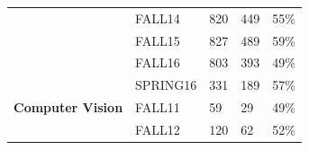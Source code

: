 \begin{table}[]
\begin{tabular}{lllll}
\textbf{}                                                                            & FALL14                                & 820                                                                                       & 449                                                                                        & 55\%                                                                                                  \\
\textbf{}                                                                            & FALL15                                & 827                                                                                       & 489                                                                                        & 59\%                                                                                                  \\
\textbf{}                                                                            & FALL16                                & 803                                                                                       & 393                                                                                        & 49\%                                                                                                  \\
\textbf{}                                                                            & SPRING16                              & 331                                                                                       & 189                                                                                        & 57\%                                                                                                  \\
\textbf{Computer Vision}                                                             & FALL11                                & 59                                                                                        & 29                                                                                         & 49\%                                                                                                  \\
\textbf{}                                                                            & FALL12                                & 120                                                                                       & 62                                                                                         & 52\%                                                                                                  \\

\end{tabular}
\end{table}
